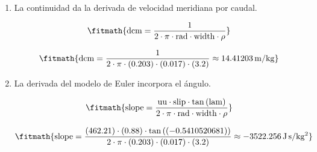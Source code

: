 \begin{enumerate}

\item La continuidad da la derivada de velocidad meridiana por caudal.

\[\fitmath{\mathrm{dcm}=\frac{1}{2\cdot \pi\cdot \mathrm{rad}\cdot \mathrm{width}\cdot \rho}}\]

\[\fitmath{\mathrm{dcm}=\frac{1}{2\cdot \pi\cdot (0.203)\cdot (0.017)\cdot (3.2)}\approx 14.41203\,\mathrm{m/kg}}\]

\item La derivada del modelo de Euler incorpora el ángulo.

\[\fitmath{\mathrm{slope}=\frac{\mathrm{uu}\cdot \mathrm{slip}\cdot \tan\left(\mathrm{lam}\right)}{2\cdot \pi\cdot \mathrm{rad}\cdot \mathrm{width}\cdot \rho}}\]

\[\fitmath{\mathrm{slope}=\frac{(462.21)\cdot (0.88)\cdot \tan\left((-0.5410520681)\right)}{2\cdot \pi\cdot (0.203)\cdot (0.017)\cdot (3.2)}\approx -3522.256\,\mathrm{J\,s/kg^{2}}}\]

\end{enumerate}
